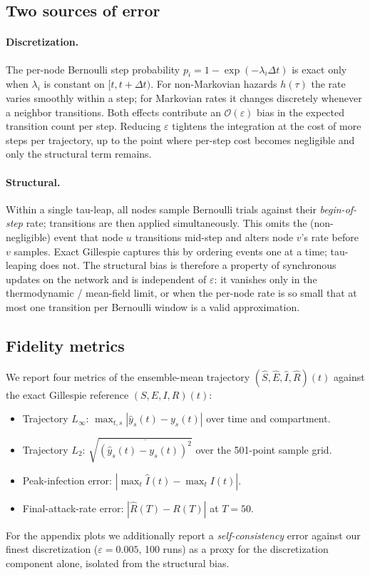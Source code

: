 \documentclass[a4paper,fleqn]{cas-sc}
\theoremstyle{definition}
\theoremstyle{remark}
\newcommand{\bigO}{\mathcal{O}}
\begin{document}
\subsection{Two sources of error}

\paragraph{Discretization.} The per-node Bernoulli step probability $p_i = 1 - \exp(-\lambda_i \Delta t)$ is exact only when $\lambda_i$ is constant on $[t, t + \Delta t)$. For non-Markovian hazards $h(\tau)$ the rate varies smoothly within a step; for Markovian rates it changes discretely whenever a neighbor transitions. Both effects contribute an $\bigO(\varepsilon)$ bias in the expected transition count per step. Reducing $\varepsilon$ tightens the integration at the cost of more steps per trajectory, up to the point where per-step cost becomes negligible and only the structural term remains.

\paragraph{Structural.} Within a single tau-leap, all nodes sample Bernoulli trials against their \emph{begin-of-step} rate; transitions are then applied simultaneously. This omits the (non-negligible) event that node $u$ transitions mid-step and alters node $v$'s rate before $v$ samples. Exact Gillespie captures this by ordering events one at a time; tau-leaping does not. The structural bias is therefore a property of synchronous updates on the network and is independent of $\varepsilon$: it vanishes only in the thermodynamic / mean-field limit, or when the per-node rate is so small that at most one transition per Bernoulli window is a valid approximation.

\subsection{Fidelity metrics}

We report four metrics of the ensemble-mean trajectory $(\hat S, \hat E, \hat I, \hat R)(t)$ against the exact Gillespie reference $(S, E, I, R)(t)$:
\begin{itemize}
\item Trajectory $L_\infty$: $\max_{t, s} |\hat y_s(t) - y_s(t)|$ over time and compartment.
\item Trajectory $L_2$: $\sqrt{\overline{(\hat y_s(t) - y_s(t))^2}}$ over the 501-point sample grid.
\item Peak-infection error: $|\max_t \hat I(t) - \max_t I(t)|$.
\item Final-attack-rate error: $|\hat R(T) - R(T)|$ at $T = 50$.
\end{itemize}
For the appendix plots we additionally report a \emph{self-consistency} error against our finest discretization ($\varepsilon = 0.005$, 100 runs) as a proxy for the discretization component alone, isolated from the structural bias.
\end{document}

